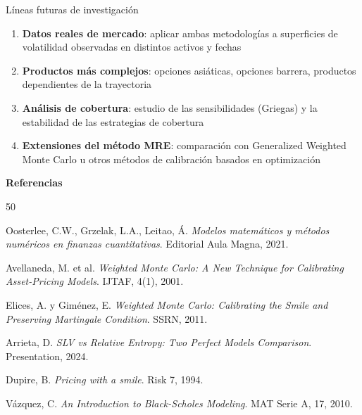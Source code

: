 \documentclass[8pt]{beamer}
\begin{document}
\begin{frame}{Líneas futuras de investigación}
    \begin{enumerate}
        \item \textbf{Datos reales de mercado}: aplicar ambas metodologías a superficies de volatilidad observadas en distintos activos y fechas
        \pause
        
        \item \textbf{Productos más complejos}: opciones asiáticas, opciones barrera, productos dependientes de la trayectoria
        \pause
        
        \item \textbf{Análisis de cobertura}: estudio de las sensibilidades (Griegas) y la estabilidad de las estrategias de cobertura
        \pause
        
        \item \textbf{Extensiones del método MRE}: comparación con Generalized Weighted Monte Carlo u otros métodos de calibración basados en optimización
    \end{enumerate}
\end{frame}


\begin{frame}{\bf Referencias}
\begin{thebibliography}{50}
\scriptsize

   Oosterlee, C.W., Grzelak, L.A., Leitao, Á.
  {\em Modelos matemáticos y métodos numéricos en finanzas cuantitativas}. Editorial Aula Magna, 2021.

   Avellaneda, M. et al.
  {\em Weighted Monte Carlo: A New Technique for Calibrating Asset-Pricing Models}. IJTAF, 4(1), 2001.

   Elices, A. y Giménez, E.
  {\em Weighted Monte Carlo: Calibrating the Smile and Preserving Martingale Condition}. SSRN, 2011.

   Arrieta, D.
  {\em SLV vs Relative Entropy: Two Perfect Models Comparison}. Presentation, 2024.

   Dupire, B.
  {\em Pricing with a smile}. Risk 7, 1994.

   Vázquez, C.
  {\em An Introduction to Black-Scholes Modeling}. MAT Serie A, 17, 2010.

\end{thebibliography}
\end{frame}
\end{document}
